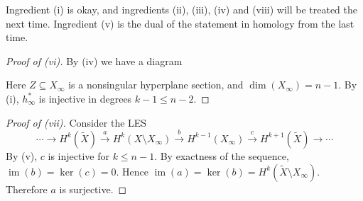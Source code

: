 \documentclass[A4paper, british]{amsart}
\theoremstyle{darkgreentheorem}
\theoremstyle{darkbluedefinition}
\theoremstyle{darkredexample}
\theoremstyle{remark}
\DeclareMathOperator{\im}{im}
\newcommand{\1}{\mathbbm{1}}
\newcommand{\op}{\oplus}
\newcommand{\sub}{\subseteq}
\begin{document}
Ingredient (i) is okay, and ingredients (ii), (iii), (iv) and (viii) will be treated the next time.
Ingredient (v) is the dual of the statement in homology from the last time.

\begin{proof}[Proof of (vi)]
    By (iv) we have a diagram
    \begin{center}
    \end{center}
    Here $Z\sub X_{\infty}$ is a nonsingular hyperplane section, and $\dim(X_{\infty})=n-1$.
    By (i), $h_{\infty}^{*}$ is injective in degrees $k-1\leqslant n-2$.
\end{proof}

\begin{proof}[Proof of (vii)]
    Consider the LES
    \[ \cdots \to H^{k}(\tilde{X})\xrightarrow{a} H^{k}(X\setminus X_{\infty})\xrightarrow{b} H^{k-1}(X_{\infty})\xrightarrow{c}H^{k+1}(\tilde{X})\to \cdots \]
    By (v), $c$ is injective for $k\leqslant n-1$.
    By exactness of the sequence, $\im(b)=\ker(c)=0$.
    Hence $\im(a)=\ker(b)=H^{k}(\tilde{X}\setminus X_{\infty})$.
    Therefore $a$ is surjective.
\end{proof}
\end{document}
